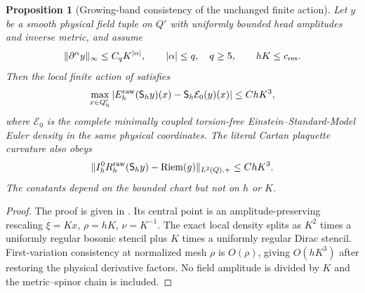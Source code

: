 \documentclass[11pt]{article}
\numberwithin{equation}{section}
\newtheorem{proposition}[proposition]{Proposition}
\theoremstyle{definition}
\theoremstyle{remark}
\newcommand{\Riem}{\operatorname{Riem}}
\newcommand{\norm}[1]{\lVert#1\rVert}
\begin{document}
\begin{proposition}[Growing-band consistency of the unchanged finite action]
\label{prop:native-consistency}
Let $y$ be a smooth physical field tuple on $Q'$ with uniformly bounded head amplitudes and inverse metric, and assume
\begin{equation}
 \norm{\partial^\alpha y}_\infty\le C_qK^{|\alpha|},
 \qquad |\alpha|\le q,\quad q\ge5,
 \qquad hK\le c_{\rm res}.
 \label{eq:growing-derivatives}
\end{equation}
Then the local finite action of  satisfies
\begin{equation}
 \max_{x\in Q'_h}\left|E_h^{\rm raw}(\mathsf S_hy)(x)
 -\mathsf S_h\mathcal E_0(y)(x)\right|\le ChK^3,
 \label{eq:native-consistency}
\end{equation}
where $\mathcal E_0$ is the complete minimally coupled torsion-free Einstein--Standard-Model Euler density in the same physical coordinates.  The literal Cartan plaquette curvature also obeys
\begin{equation}
 \norm{I_h^0R_h^{\rm raw}(\mathsf S_hy)-\Riem(g)}_{L^2(Q),+}
 \le ChK^3.
 \label{eq:native-Cartan}
\end{equation}
The constants depend on the bounded chart but not on $h$ or $K$.
\end{proposition}
\begin{proof}
The proof is given in .  Its central point is an amplitude-preserving rescaling $\xi=Kx$, $\rho=hK$, $\nu=K^{-1}$.  The exact local density splits as $K^2$ times a uniformly regular bosonic stencil plus $K$ times a uniformly regular Dirac stencil.  First-variation consistency at normalized mesh $\rho$ is $O(\rho)$, giving $O(hK^3)$ after restoring the physical derivative factors.  No field amplitude is divided by $K$ and the metric--spinor chain is included.
\end{proof}
\end{document}
